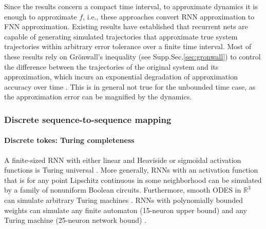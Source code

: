 \documentclass{article}
\theoremstyle{definition}
\theoremstyle{remark}
\newcommand{\reals}{\mathbb{R}}
\newcounter{ct}
\begin{document}
Since the results concern a compact time interval, to approximate dynamics it is enough to approximate $f$, i.e., these approaches convert RNN approximation to FNN approximation.
Existing results have established that recurrent nets are capable of generating simulated trajectories that approximate true system trajectories within arbitrary error tolerance over a finite time interval.
Most of these results rely on Gr\"{o}nwall’s inequality (see Supp.Sec.\ref{sec:gronwall}) to control the difference between the trajectories of the original system and its approximation, which incurs an exponential degradation of approximation accuracy over time
\citep{sontag1992neural, sontag1998learning, funahashi1993approximation, chow2000modeling, li2005approximation}.
This is in general not true for the unbounded time case, as the approximation error can be magnified by the dynamics.




\subsubsection{Discrete sequence-to-sequence mapping}\label{sec:discrete}
\paragraph{Discrete tokes: Turing completeness}

A finite-sized RNN with either linear and Heaviside or sigmoidal activation functions is Turing universal \citep{pollack1991induction, siegelmann1992computational,kilian1996universality}.
%
More generally, RNNs with an activation function that is for any point Lipschitz continuous in some neighborhood can be simulated by a family of nonuniform Boolean circuits\citep{siegelmann1994analog}.
%
Furthermore, smooth ODES in $\reals^3$ can simulate arbitrary Turing machines \citep{branicky1995universal}. %
%
RNNs with polynomially bounded weights can simulate any finite automaton (15-neuron upper bound) and any Turing machine (25-neuron network bound) \citep{indyk1995optimal}.
\end{document}
